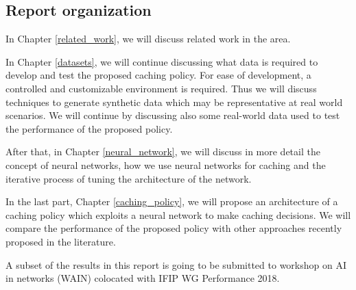 \subsection{Report organization} \label{report_organization}

In Chapter \ref{related_work}, we will discuss related work in the area.

In Chapter \ref{datasets}, we will continue discussing what data is required to develop and test the proposed caching policy. For ease of development, a controlled and customizable environment is required. Thus we will discuss techniques to generate synthetic data which may be representative at real world scenarios. We will continue by discussing also some real-world data used to test the performance of the proposed policy.

After that, in Chapter \ref{neural_network}, we will discuss in more detail the concept of neural networks, how we use neural networks for caching and the iterative process of tuning the architecture of the network.

In the last part, Chapter \ref{caching_policy}, we will propose an architecture of a caching policy which exploits a neural network to make caching decisions. We will compare the performance of the proposed policy with other approaches recently proposed in the literature.

A subset of the results in this report is going to be submitted to workshop on AI in networks (WAIN) colocated with IFIP WG Performance 2018.



